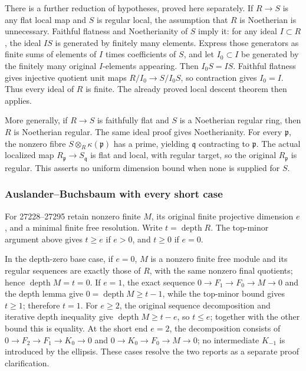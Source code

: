 There is a further reduction of hypotheses, proved here separately. If \(R\to S\) is any flat local map and \(S\) is regular local, the assumption that \(R\) is Noetherian is unnecessary. Faithful flatness and Noetherianity of \(S\) imply it: for any ideal \(I\subset R\), the ideal \(IS\) is generated by finitely many elements. Express those generators as finite sums of elements of \(I\) times coefficients of \(S\), and let \(I_0\subset I\) be generated by the finitely many original \(I\)-elements appearing. Then \(I_0S=IS\). Faithful flatness gives injective quotient unit maps \(R/I_0\to S/I_0S\), so contraction gives \(I_0=I\). Thus every ideal of \(R\) is finite. The already proved local descent theorem then applies.

More generally, if \(R\to S\) is faithfully flat and \(S\) is a Noetherian regular ring, then \(R\) is Noetherian regular. The same ideal proof gives Noetherianity. For every \(\mathfrak p\), the nonzero fibre \(S\otimes_R\kappa(\mathfrak p)\) has a prime, yielding \(\mathfrak q\) contracting to \(\mathfrak p\). The actual localized map \(R_{\mathfrak p}\to S_{\mathfrak q}\) is flat and local, with regular target, so the original \(R_{\mathfrak p}\) is regular. This asserts no uniform dimension bound when none is supplied for \(S\).

\subsubsection{Auslander--Buchsbaum with every short case}\label{algebra-proof-023-auslanderbuchsbaum-with-every-short-case}

For 27228--27295 retain nonzero finite \(M\), its original finite projective dimension \(e\), and a minimal finite free resolution. Write \(t=\operatorname{depth}R\). The top-minor argument above gives \(t\ge e\) if \(e>0\), and \(t\ge0\) if \(e=0\).

In the depth-zero base case, if \(e=0\), \(M\) is a nonzero finite free module and its regular sequences are exactly those of \(R\), with the same nonzero final quotients; hence \(\operatorname{depth}M=t=0\). If \(e=1\), the exact sequence \(0\to F_1\to F_0\to M\to0\) and the depth lemma give \(0=\operatorname{depth}M\ge t-1\), while the top-minor bound gives \(t\ge1\); therefore \(t=1\). For \(e\ge2\), the original sequence decomposition and iterative depth inequality give \(\operatorname{depth}M\ge t-e\), so \(t\le e\); together with the other bound this is equality. At the short end \(e=2\), the decomposition consists of \(0\to F_2\to F_1\to K_0\to0\) and \(0\to K_0\to F_0\to M\to0\); no intermediate \(K_{-1}\) is introduced by the ellipsis. These cases resolve the two reports as a separate proof clarification.

